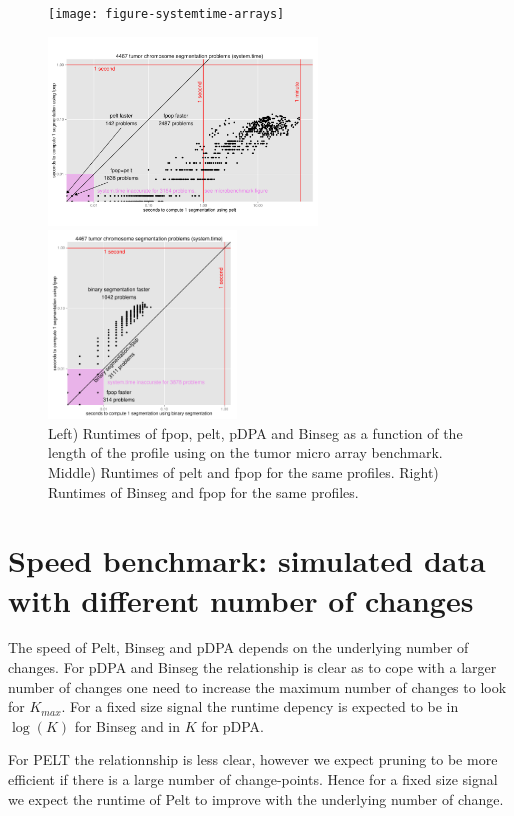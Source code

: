 \documentclass{article}
\begin{document}
\begin{figure}\label{fig:sys_runtimes_microarray}
 \parbox{6.5cm}{ \texttt{[image: figure-systemtime-arrays]}
  } \parbox{6.5cm}{  \includegraphics[height=5cm]{figure-systemtime-arrays-fpop-pelt}}
 \parbox{6cm}{ \includegraphics[height=5cm]{figure-systemtime-arrays-fpop-multiBinSeg}}
 

\caption{Left) Runtimes of fpop, pelt,
pDPA and Binseg as a function of the length of the profile  using  on the tumor micro array benchmark. 
Middle) Runtimes of pelt and fpop for the same profiles.
Right) Runtimes of Binseg and fpop for the same profiles.
}
\end{figure}





\section{Speed benchmark: simulated data with different 
  number of changes}

The speed of Pelt, Binseg and pDPA depends on the underlying number of changes.
For pDPA and Binseg the relationship is clear as to cope with a larger number of changes
one need to increase the maximum number of changes to look for $K_{max}$. 
For a fixed size signal the runtime depency is expected to be in $\log(K)$ for Binseg and
in $K$ for pDPA.

For PELT the relationnship is less clear, however we expect pruning to be more efficient
if there is a large number of change-points. Hence for a fixed size signal we expect 
the runtime of Pelt to improve with the underlying number of change.
\end{document}
